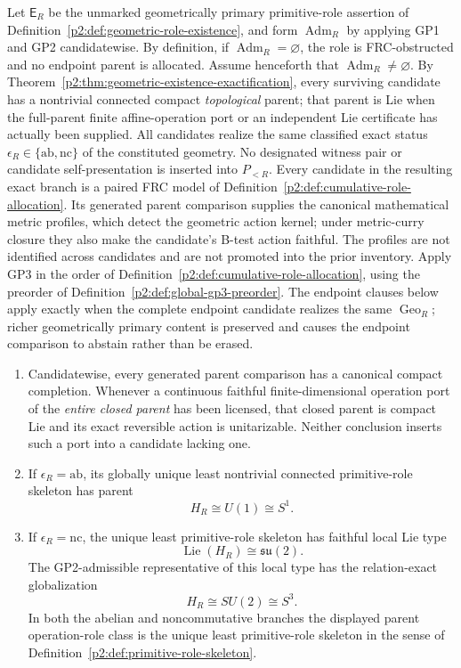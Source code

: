 \documentclass[12pt,a4paper]{article}
\begin{document}
\begin{theorem}
\label{p2:thm:master-compact-role-allocation}
\label{p2:thm:gp-least-role-chain}
\label{p2:thm:gp-minimal-role-chain}
Let \(\mathsf E_R\) be the unmarked geometrically primary primitive-role
assertion of Definition~\ref{p2:def:geometric-role-existence}, and form
\(\operatorname{Adm}_R\) by applying GP1 and GP2 candidatewise.  By
definition, if \(\operatorname{Adm}_R=\varnothing\), the role is
FRC-obstructed and no endpoint parent is allocated.  Assume henceforth that
\(\operatorname{Adm}_R\ne\varnothing\).  By
Theorem~\ref{p2:thm:geometric-existence-exactification}, every surviving
candidate has a nontrivial connected compact \emph{topological} parent;
that parent is Lie when the full-parent finite affine-operation port or an
independent Lie certificate has actually been supplied.  All candidates
realize the same classified exact status
\(\epsilon_R\in\{\mathrm{ab},\mathrm{nc}\}\) of the constituted geometry.
No designated witness pair or candidate self-presentation is inserted into
\(P_{<R}\).  Every candidate in the resulting exact branch is a paired FRC model
of Definition~\ref{p2:def:cumulative-role-allocation}.  Its generated parent
comparison supplies the canonical mathematical metric profiles, which detect
the geometric action kernel; under metric-curry closure they also make the
candidate's B-test action faithful.  The profiles are not identified across
candidates and are not promoted into the prior inventory.  Apply GP3
in the order of Definition~\ref{p2:def:cumulative-role-allocation}, using the
preorder of Definition~\ref{p2:def:global-gp3-preorder}.  The endpoint clauses
below apply exactly when the complete endpoint candidate realizes the same
\(\operatorname{Geo}_R\); richer geometrically primary content is preserved and
causes the endpoint comparison to abstain rather than be erased.
\begin{enumerate}[label=(\roman*), leftmargin=2em]
\item Candidatewise, every generated parent comparison has a canonical
compact completion.  Whenever a continuous faithful finite-dimensional
operation port of the \emph{entire closed parent} has been licensed, that
closed parent is compact Lie and its exact reversible action is unitarizable.
Neither conclusion inserts such a port into a candidate lacking one.
\item If \(\epsilon_R=\mathrm{ab}\), its globally unique least nontrivial connected
primitive-role skeleton has parent
\[
 H_R\cong U(1)\cong S^1.
\]
\item If \(\epsilon_R=\mathrm{nc}\), the unique least
primitive-role skeleton has faithful local Lie type
\[
 \operatorname{Lie}(H_R)\cong\mathfrak{su}(2).
\]
The GP2-admissible representative of this local type has the relation-exact
globalization
\[
 H_R\cong SU(2)\cong S^3.
\]
In both the abelian and noncommutative branches the displayed parent
operation-role class is the unique least primitive-role skeleton in the sense
of Definition~\ref{p2:def:primitive-role-skeleton}.


\end{enumerate}
\end{theorem}
\end{document}
